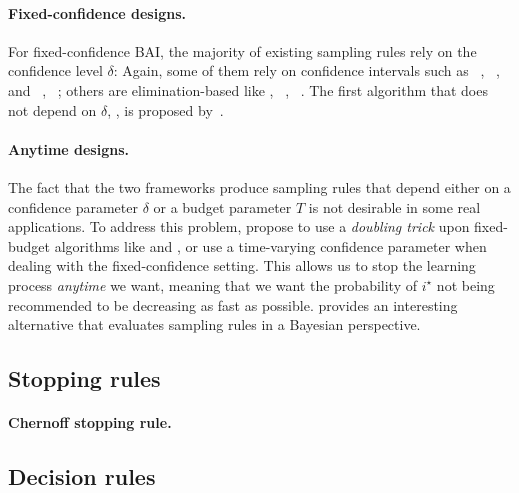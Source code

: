 \paragraph{Fixed-confidence designs.}

For fixed-confidence BAI, the majority of existing sampling rules rely on the confidence level $\delta$: Again, some of them rely on confidence intervals such as \LUCB~\citep{kalyanakrishnan2012lucb}, \UGapE~\citep{gabillon2012ugape}, \KLLUCB and \KLRacing~\citep{kaufmann2013kl}, \LIL~\citep{jamieson2014lilucb}; others are elimination-based like \SE, \ME~\citep{even-dar2003confidence}, \EGE~\citep{karnin2013sha}. The first algorithm that does not depend on $\delta$, \Track, is proposed by~\cite{garivier2016tracknstop}.

\paragraph{Anytime designs.}

The fact that the two frameworks produce sampling rules that depend either on a confidence parameter $\delta$ or a budget parameter $T$ is not desirable in some real applications. To address this problem, \cite{jun2016atlucb} propose to use a \emph{doubling trick} upon fixed-budget algorithms like \SR and \SHA, or use a time-varying confidence parameter when dealing with the fixed-confidence setting. This allows us to stop the learning process \emph{anytime} we want, meaning that we want the probability of $i^{\star}$ not being recommended to be decreasing as fast as possible. \cite{russo2016ttts} provides an interesting alternative that evaluates sampling rules in a Bayesian perspective. %

\subsection{Stopping rules}\label{sec:mab.bai.stopping}

\paragraph{Chernoff stopping rule.}

\subsection{Decision rules}\label{sec:mab.bai.decision}

